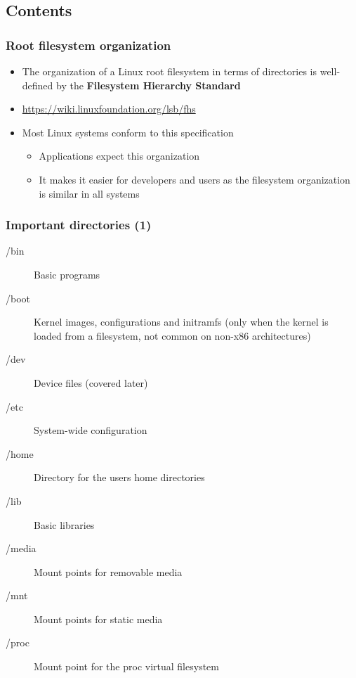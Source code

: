 \subsection{Contents}

\begin{frame}
  \frametitle{Root filesystem organization}
  \begin{itemize}
  \item The organization of a Linux root filesystem in terms of
    directories is well-defined by the {\bf Filesystem Hierarchy
      Standard}
  \item \url{https://wiki.linuxfoundation.org/lsb/fhs}
  \item Most Linux systems conform to this specification
    \begin{itemize}
    \item Applications expect this organization
    \item It makes it easier for developers and users as the
      filesystem organization is similar in all systems
    \end{itemize}
  \end{itemize}
\end{frame}

\begin{frame}
  \frametitle{Important directories (1)}
  \begin{description}
  \item[/bin] Basic programs
  \item[/boot] Kernel images, configurations and initramfs
    (only when the kernel is loaded from a
    filesystem, not common on non-x86 architectures)
  \item[/dev] Device files (covered later)
  \item[/etc] System-wide configuration
  \item[/home] Directory for the users home directories
  \item[/lib] Basic libraries
  \item[/media] Mount points for removable media
  \item[/mnt] Mount points for static media
  \item[/proc] Mount point for the proc virtual filesystem
  \end{description}
\end{frame}

